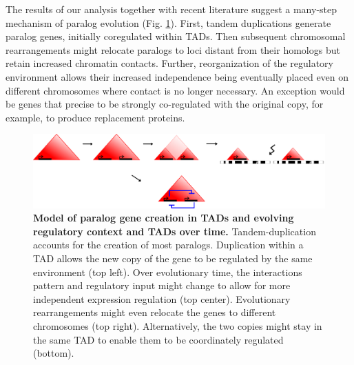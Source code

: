 \documentclass[a4paper,twoside=true,openright,parskip=full,chapterprefix=true,11pt,headings=normal,bibliography=totoc,listof=totoc,titlepage=on,captions=tableabove,draft=false]{scrreprt}
\theoremstyle{definition}
\theoremstyle{definition}
\theoremstyle{definition}
\theoremstyle{remark}
\begin{document}
The results of our analysis together with recent literature suggest a
many-step mechanism of paralog evolution (Fig.
\ref{fig:ParalogSeparation}). First, tandem duplications generate
paralog genes, initially coregulated within TADs. Then subsequent
chromosomal rearrangements might relocate paralogs to loci distant from
their homologs but retain increased chromatin contacts. Further,
reorganization of the regulatory environment allows their increased
independence being eventually placed even on different chromosomes where
contact is no longer necessary. An exception would be genes that precise
to be strongly co-regulated with the original copy, for example, to
produce replacement proteins.

\begin{figure}

{\centering \includegraphics[width=0.8\linewidth]{figures/model_paralog_expansion} 

}

\caption{\textbf{Model of paralog gene creation in TADs
and evolving regulatory context and TADs over time.} Tandem-duplication
accounts for the creation of most paralogs. Duplication within a TAD
allows the new copy of the gene to be regulated by the same environment
(top left). Over evolutionary time, the interactions pattern and
regulatory input might change to allow for more independent expression
regulation (top center). Evolutionary rearrangements might even relocate
the genes to different chromosomes (top right). Alternatively, the two
copies might stay in the same TAD to enable them to be coordinately
regulated (bottom).}\label{fig:ParalogSeparation}
\end{figure}
\end{document}
